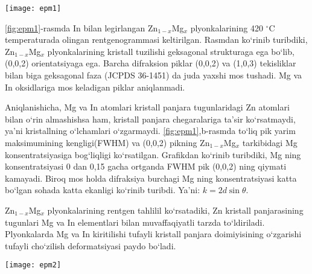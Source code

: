 \documentclass[14pt]{article}
\begin{document}
	
	
\begin{figure*}[h]
	\centering
	\texttt{[image: epm1]}
	\caption{Zn$_{1-x}$Mg$_{x}$ plyonkalarining rentgenogrammalari. b - yupqa Zn$_{1-x}$Mg$_{x}$ plyonkalarda piklarning Mg konsentratsiyasiga bog`liq ravishda siljishi }
	\label{fig:epm1}
\end{figure*}

\ref{fig:epm1}-rasmda In bilan legirlangan Zn$_{1-x}$Mg$_{x}$ plyonkalarining 420 $^{\circ}$C temperaturada olingan rentgenogrammasi keltirilgan. Rasmdan ko`rinib turibdiki, Zn$_{1-x}$Mg$_{x}$ plyonkalarining kristall tuzilishi geksagonal strukturaga ega bo`lib, (0,0,2) orientatsiyaga ega. Barcha difraksion piklar (0,0,2) va (1,0,3) tekisliklar bilan biga geksagonal faza (JCPDS 36-1451) da juda yaxshi mos tushadi. Mg va In oksidlariga mos keladigan piklar aniqlanmadi. 

Aniqlanishicha, Mg va In atomlari kristall panjara tugunlaridagi Zn atomlari bilan o`rin almashishsa ham, kristall panjara chegaralariga ta'sir ko`rsatmaydi, ya'ni kristallning o`lchamlari o`zgarmaydi. \ref{fig:epm1},b-rasmda to`liq pik yarim maksimumining kengligi(FWHM) va (0,0,2) pikning Zn$_{1-x}$Mg$_{x}$ tarkibidagi Mg konsentratsiyasiga bog`liqligi  ko`rsatilgan. Grafikdan ko`rinib turibdiki, Mg ning konsentratsiyasi 0 dan 0,15 gacha ortganda FWHM pik (0,0,2) ning qiymati kamayadi. Biroq mos holda difraksiya burchagi Mg ning konsentratsiyasi katta bo`lgan sohada katta ekanligi ko`rinib turibdi. Ya'ni: $k=2d\sin\theta$. 
	
	Zn$_{1-x}$Mg$_{x}$ plyonkalarining rentgen tahlilil ko`rsatadiki, Zn kristall panjarasining tugunlari Mg va In elementlari bilan muvaffaqiyatli tarzda to`ldiriladi. Plyonkalarda Mg va In kiritilishi tufayli kristall panjara doimiyisining o`zgarishi tufayli cho`zilish deformatsiyasi paydo bo`ladi. 
	
	
	
\begin{figure*}[h]
	\centering
	\texttt{[image: epm2]}
	\caption{Mg ning turli konsentratsiyalarida Zn$_{1-x}$Mg$_{x}$ plyonkalarining FESEM da olingan tasviri: a) x=0,\  b) x=0,05, \ c) x=0,10,\  d) x=0,10, \ e)  namunalarning ko`ndalang kesimi morfologiyasi, x=0,15 da In va Mg elemantlarining taqsimoti (mos holda f va g)}
	\label{fig:epm2}
\end{figure*}
\end{document}
